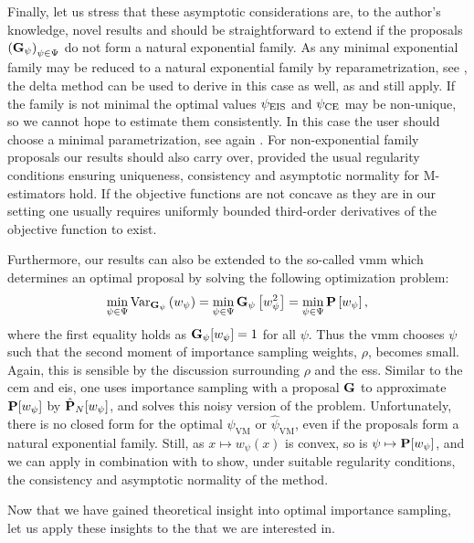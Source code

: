 Finally, let us stress that these asymptotic considerations are, to the author's knowledge, novel results and should be straightforward to extend if the proposals $\left(\G_{\psi}\right)_{\psi \in \Psi}$ do not form a natural exponential family. As any minimal exponential family may be reduced to a natural exponential family by reparametrization, see \citep[Theorem 1.9]{Brown1986Fundamentals}, the delta method can be used to derive  in this case as well, as  and  still apply. If the family is not minimal the optimal values $\peis$ and $\pce$ may be non-unique, so we cannot hope to estimate them consistently. In this case the user should choose a minimal parametrization, see again \citep[Theorem 1.9]{Brown1986Fundamentals}. 
For non-exponential family proposals our results should also carry over, provided the usual regularity conditions ensuring uniqueness, consistency and asymptotic normality for M-estimators hold. If the objective functions are not concave as they are in our setting one usually requires uniformly bounded third-order derivatives of the objective function to exist. 

Furthermore, our results can also be extended to the so-called \gls{vmm} which determines an optimal proposal by solving the following optimization problem:
$$
\min_{\psi\in\Psi} \var_{\G_{\psi}} \left( w_{\psi}  \right) = \min_{\psi \in \Psi} \G_{\psi} \left[w_{\psi}^2\right] = \min_{\psi\in\Psi} \P \left[w_{\psi} \right],
$$
where the first equality holds as $\G_{\psi}[w_{\psi}] = 1$ for all $\psi$. Thus the \acrshort{vmm} chooses $\psi$ such that the second moment of importance sampling weights, $\rho$, becomes small. Again, this is sensible by the discussion surrounding $\rho$ and the \acrshort{ess}. Similar to the \acrshort{cem} and \acrshort{eis}, one uses importance sampling with a proposal $\G$ to approximate $\P [w_{\psi}]$ by $\hat\P_{N} [w_{\psi}]$, and solves this noisy version of the problem.
Unfortunately, there is no closed form for the optimal $\psi_{\text{VM}}$ or $\hat\psi_{\text{VM}}$, even if the proposals form a natural exponential family. Still, as $x \mapsto w_{\psi}(x)$ is convex, so is $\psi \mapsto \P [w_{\psi}]$, and we can apply  in combination with  to show, under suitable regularity conditions, the consistency and asymptotic normality of the method. 

Now that we have gained theoretical insight into optimal importance sampling, let us apply these insights to the  that we are interested in.
